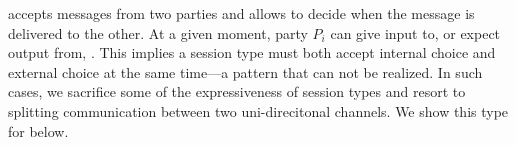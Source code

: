 \Fauth accepts messages from two parties and allows \A to decide when the message is delivered to the other.
At a given moment, party $P_i$ can give input to, or expect output from, \Fauth. This implies a session type must both accept internal choice and external choice at the same time---a pattern that can not be realized.
In such cases, we sacrifice some of the expressiveness of session types and resort to splitting communication between two uni-direcitonal channels.
We show this type for \Fauth below. 

